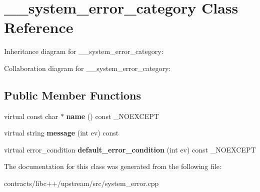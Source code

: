 \hypertarget{class____system__error__category}{}\section{\+\_\+\+\_\+system\+\_\+error\+\_\+category Class Reference}
\label{class____system__error__category}


Inheritance diagram for \+\_\+\+\_\+system\+\_\+error\+\_\+category\+:


Collaboration diagram for \+\_\+\+\_\+system\+\_\+error\+\_\+category\+:
\subsection*{Public Member Functions}
\begin{DoxyCompactItemize}
\item 
\mbox{\label{class____system__error__category_afc6b7c7de28dca5d177a676c740f1992}} 
virtual const char $\ast$ {\bfseries name} () const \+\_\+\+N\+O\+E\+X\+C\+E\+PT
\item 
\mbox{\label{class____system__error__category_a24d12f5d14178211c7599de9967cd026}} 
virtual string {\bfseries message} (int ev) const
\item 
\mbox{\label{class____system__error__category_a10fcdb010b0bb2b2b2eca1ca488a998d}} 
virtual error\+\_\+condition {\bfseries default\+\_\+error\+\_\+condition} (int ev) const \+\_\+\+N\+O\+E\+X\+C\+E\+PT
\end{DoxyCompactItemize}


The documentation for this class was generated from the following file\+:\begin{DoxyCompactItemize}
\item 
contracts/libc++/upstream/src/system\+\_\+error.\+cpp\end{DoxyCompactItemize}
